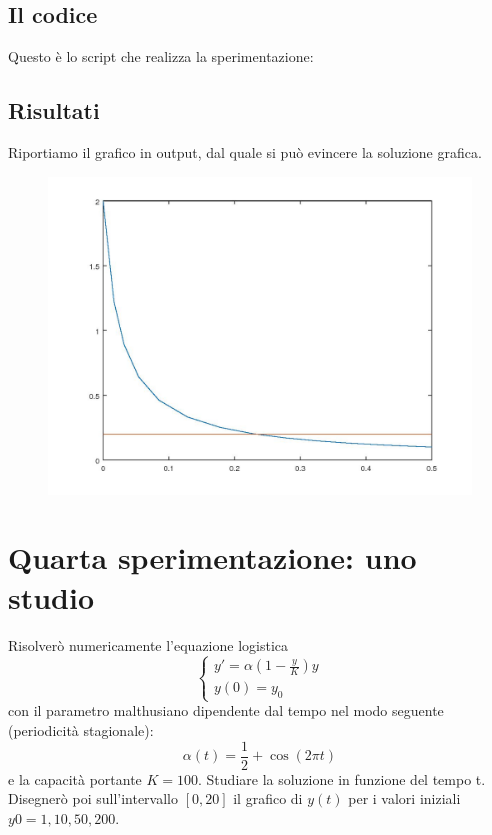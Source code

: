 \documentclass{article}
\begin{document}
	\subsection{Il codice}
	Questo è lo script che realizza la sperimentazione:
	
	\subsection{Risultati}
	Riportiamo il grafico in output, dal quale si può evincere la soluzione grafica.
	\begin{figure}[htp!]
		\centering 
		\includegraphics[width=\textwidth]{3_3.jpeg}
	\end{figure}
	\newpage
	\section{Quarta sperimentazione: uno studio}
	Risolverò numericamente l’equazione logistica
		\begin{equation}
	\begin{cases}
	y'=\alpha \left(1-\frac{y}{K}\right) y \\
	y(0)=y_0
	\end{cases}
	\end{equation}
	con il parametro malthusiano dipendente dal tempo nel modo seguente (periodicità stagionale):
	$$\alpha(t)=\frac{1}{2}+ \cos(2 \pi t)$$
	e la capacità portante $K = 100$. Studiare la soluzione in funzione del tempo t.\\
	Disegnerò poi sull’intervallo $\left[0, 20\right]$ il grafico di $y(t)$ per i valori iniziali $y0 = 1, 10, 50, 200$.
	
\end{document}
